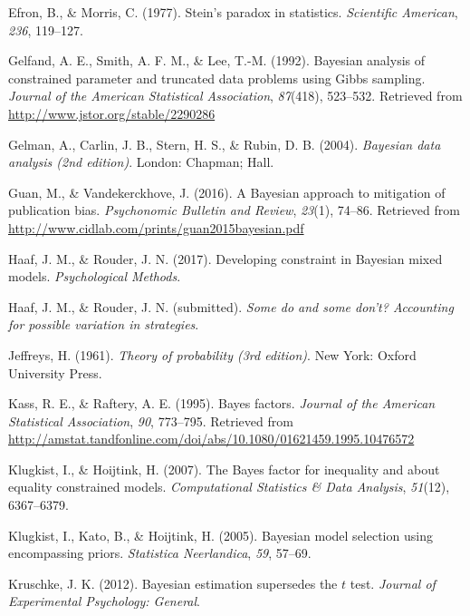 \documentclass[english,man]{apa6}
\theoremstyle{definition}
\theoremstyle{definition}
\theoremstyle{remark}
\begin{document}
\hypertarget{ref-Efron:Morris:1977}{}
Efron, B., \& Morris, C. (1977). Stein's paradox in statistics.
\emph{Scientific American}, \emph{236}, 119--127.

\hypertarget{ref-Gelfand:etal:1992}{}
Gelfand, A. E., Smith, A. F. M., \& Lee, T.-M. (1992). Bayesian analysis
of constrained parameter and truncated data problems using Gibbs
sampling. \emph{Journal of the American Statistical Association},
\emph{87}(418), 523--532. Retrieved from
\url{http://www.jstor.org/stable/2290286}

\hypertarget{ref-Gelman:etal:2004}{}
Gelman, A., Carlin, J. B., Stern, H. S., \& Rubin, D. B. (2004).
\emph{Bayesian data analysis (2nd edition)}. London: Chapman; Hall.

\hypertarget{ref-Guan:Vandekerckhove:2016}{}
Guan, M., \& Vandekerckhove, J. (2016). A Bayesian approach to
mitigation of publication bias. \emph{Psychonomic Bulletin and Review},
\emph{23}(1), 74--86. Retrieved from
\url{http://www.cidlab.com/prints/guan2015bayesian.pdf}

\hypertarget{ref-Haaf:Rouder:2017}{}
Haaf, J. M., \& Rouder, J. N. (2017). Developing constraint in Bayesian
mixed models. \emph{Psychological Methods}.

\hypertarget{ref-Haaf:Rouder:submitted}{}
Haaf, J. M., \& Rouder, J. N. (submitted). \emph{Some do and some don't?
Accounting for possible variation in strategies}.

\hypertarget{ref-Jeffreys:1961}{}
Jeffreys, H. (1961). \emph{Theory of probability (3rd edition)}. New
York: Oxford University Press.

\hypertarget{ref-Kass:Raftery:1995}{}
Kass, R. E., \& Raftery, A. E. (1995). Bayes factors. \emph{Journal of
the American Statistical Association}, \emph{90}, 773--795. Retrieved
from
\url{http://amstat.tandfonline.com/doi/abs/10.1080/01621459.1995.10476572}

\hypertarget{ref-Klugkist:Hoijtink:2007}{}
Klugkist, I., \& Hoijtink, H. (2007). The Bayes factor for inequality
and about equality constrained models. \emph{Computational Statistics \&
Data Analysis}, \emph{51}(12), 6367--6379.

\hypertarget{ref-Klugkist:etal:2005}{}
Klugkist, I., Kato, B., \& Hoijtink, H. (2005). Bayesian model selection
using encompassing priors. \emph{Statistica Neerlandica}, \emph{59},
57--69.

\hypertarget{ref-Kruschke:2012}{}
Kruschke, J. K. (2012). Bayesian estimation supersedes the \(t\) test.
\emph{Journal of Experimental Psychology: General}.
\end{document}
